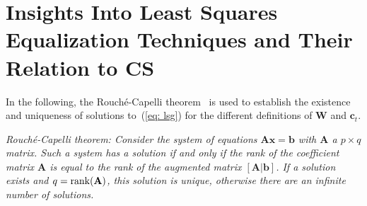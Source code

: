 \documentclass[10pt]{IEEEtran}
\begin{document}
\section{Insights Into Least Squares Equalization Techniques and Their Relation to CS}
\label{sec: theory}
In the following, the Rouch\'{e}-Capelli theorem~\cite{shafarevic_algebra_book} is used to establish the existence and uniqueness of solutions to~(\ref{eq: lsg}) for the different definitions of $\mathbf{W}$ and $\mathbf{c}_t$.

{\textit{Rouch\'{e}-Capelli theorem: \enspace
Consider the system of equations $\mathbf{A}\mathbf{x} = \mathbf{b}$ with $\mathbf{A}$ a $p \times q$ matrix. Such a system has a solution if and only if the rank of the coefficient matrix $\mathbf{A}$ is equal to the rank of the augmented matrix $[\mathbf{A}|\mathbf{b}]$. 
If a solution exists and $q = {\rm rank}(\mathbf{A})$, this solution is unique, otherwise there are an infinite number of solutions.
}}
\end{document}

